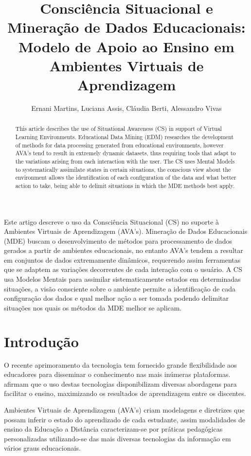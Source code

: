 \documentclass[12pt]{article}
\title{Consciência Situacional e Mineração de Dados Educacionais:
	Modelo de Apoio ao Ensino em Ambientes Virtuais de Aprendizagem }
\author{Ernani Martins\inst{1}, Luciana Assis\inst{2}, Cláudia Berti\inst{2}, Alessandro Vivas\inst{2} }
\begin{document}
 

\maketitle

\begin{abstract}
  This article describes the use of Situational Awareness (CS) in support of Virtual Learning Environments. Educational Data Mining (EDM) researches the development of methods for data processing generated from educational environments, however AVA's tend to result in extremely dynamic datasets, thus requiring tools that adapt to the variations arising from each interaction with the user. The CS uses Mental Models to systematically assimilate states in certain situations, the conscious view about the environment allows the identification of each configuration of the data and what better action to take, being able to delimit situations in which the MDE methods best apply.
\end{abstract}
     
\begin{resumo} 
  Este artigo descreve o uso da Consciência Situacional (CS) no suporte à Ambientes Virtuais de Aprendizagem (AVA's). Mineração de Dados Educacionais (MDE) buscam o desenvolvimento de métodos para processamento de dados gerados a partir de ambientes educacionais, no entanto AVA's tendem a resultar em conjuntos de dados extremamente dinâmicos, requerendo assim ferramentas que se adaptem as variações decorrentes de cada interação com o usuário. A CS usa Modelos Mentais para assimilar sistematicamente estados em determinadas situações, a visão consciente sobre o ambiente permite a identificação de cada configuração dos dados e qual melhor ação a ser tomada podendo delimitar situações nos quais os métodos da MDE melhor se aplicam.
\end{resumo}


\section{Introdução} 

O recente aprimoramento da tecnologia tem fornecido grande flexibilidade aos educadores para disseminar o conhecimento nas mais inúmeras plataformas. \cite{Ahmad_Shamsuddin_2010} afirmam que o uso destas tecnologias disponibilizam diversas abordagens para facilitar o ensino, maximizando os resultados de aprendizagem entre os discentes.

Ambientes Virtuais de Aprendizagem (AVA's) criam modelagens e diretrizes que possam inferir o estado do aprendizado de cada estudante, assim modalidades de ensino da Educação a Distância caracterizam-se por práticas pedagógicas personalizadas utilizando-se das mais diversas tecnologias da informação em vários graus educacionais. 
\end{document}
